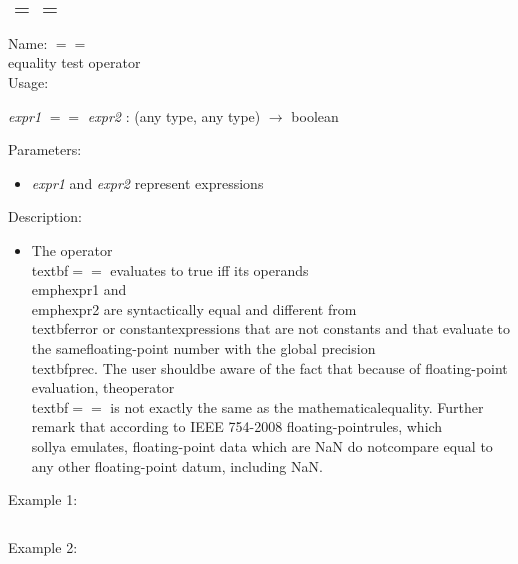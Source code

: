 \subsection{$==$}
\label{labequal}
\noindent Name: \textbf{$==$}\\
equality test operator\\
\noindent Usage: 
\begin{center}
\emph{expr1} \textbf{$==$} \emph{expr2} : (\textsf{any type}, \textsf{any type}) $\rightarrow$ \textsf{boolean}\\
\end{center}
Parameters: 
\begin{itemize}
\item \emph{expr1} and \emph{expr2} represent expressions
\end{itemize}
\noindent Description: \begin{itemize}

\item The operator \\textbf{$==$} evaluates to true iff its operands \\emph{expr1} and\n   \\emph{expr2} are syntactically equal and different from \\textbf{error} or constant\n   expressions that are not constants and that evaluate to the same\n   floating-point number with the global precision \\textbf{prec}. The user should\n   be aware of the fact that because of floating-point evaluation, the\n   operator \\textbf{$==$} is not exactly the same as the mathematical\n   equality. Further remark that according to IEEE 754-2008 floating-point\n   rules, which \\sollya emulates, floating-point data which are NaN do not\n   compare equal to any other floating-point datum, including NaN. \n\end{itemize}
\noindent Example 1: 
\begin{center}\begin{minipage}{15cm}\begin{Verbatim}[frame=single]
\end{Verbatim}
\end{minipage}\end{center}
\noindent Example 2: 
\begin{center}\begin{minipage}{15cm}\begin{Verbatim}[frame=single]
\end{Verbatim}
\end{minipage}\end{center}

